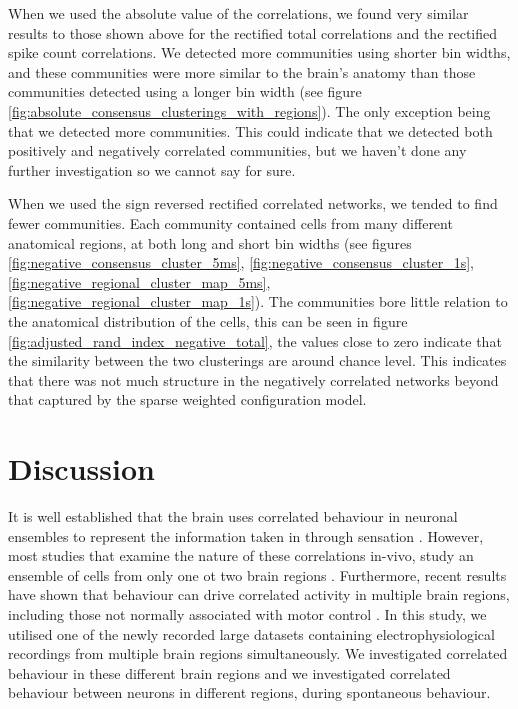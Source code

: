   When we used the absolute value of the correlations, we found very similar results to those shown above for the rectified total correlations and the rectified spike count correlations. We detected more communities using shorter bin widths, and these communities were more similar to the brain's anatomy than those communities detected using a longer bin width (see figure \ref{fig:absolute_consensus_clusterings_with_regions}). The only exception being that we detected more communities. This could indicate that we detected both positively and negatively correlated communities, but we haven't done any further investigation so we cannot say for sure.

  When we used the sign reversed rectified correlated networks, we tended to find fewer communities. Each community contained cells from many different anatomical regions, at both long and short bin widths (see figures \ref{fig:negative_consensus_cluster_5ms}, \ref{fig:negative_consensus_cluster_1s}, \ref{fig:negative_regional_cluster_map_5ms}, \ref{fig:negative_regional_cluster_map_1s}). The communities bore little relation to the anatomical distribution of the cells, this can be seen in figure \ref{fig:adjusted_rand_index_negative_total}, the values close to zero indicate that the similarity between the two clusterings are around chance level. This indicates that there was not much structure in the negatively correlated networks beyond that captured by the sparse weighted configuration model.

\section{Discussion}
It is well established that the brain uses correlated behaviour in neuronal ensembles to represent the information taken in through sensation \parencite{cohen1, litwinkumar, decharms}. However, most studies that examine the nature of these correlations in-vivo, study an ensemble of cells from only one ot two brain regions \parencite{cohen2, wierzynski, patterson, girard}. Furthermore, recent results have shown that behaviour can drive correlated activity in multiple brain regions, including those not normally associated with motor control \parencite{stringer, grundemann, allen}. In this study, we utilised one of the newly recorded large datasets containing electrophysiological recordings from multiple brain regions simultaneously. We investigated correlated behaviour in these different brain regions and we investigated correlated behaviour between neurons in different regions, during spontaneous behaviour.

